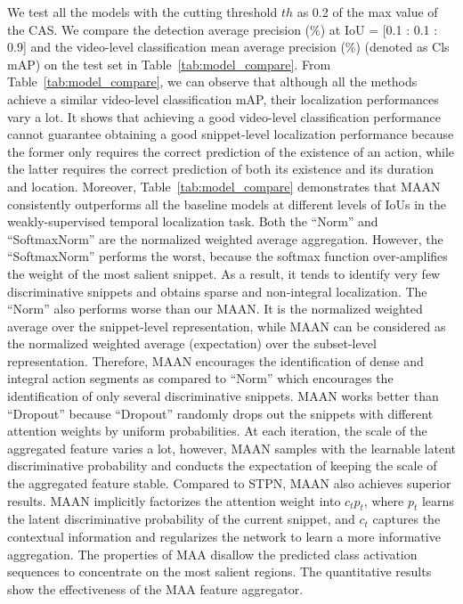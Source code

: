 \documentclass{article} \usepackage{iclr2019_conference,times}
\begin{document}
\vspace{-1mm}
We test all the models with the cutting threshold $ th $ as 0.2 of the max value of the CAS. We compare the detection average precision (\%) at IoU = [0.1 : 0.1 : 0.9] and the video-level classification mean average precision (\%) (denoted as Cls mAP) on the test set in Table~\ref{tab:model_compare}. From Table~\ref{tab:model_compare}, we can observe that although all the methods achieve a similar video-level classification mAP, their localization performances vary a lot. It shows that achieving a good video-level classification performance cannot guarantee obtaining a good snippet-level localization performance because the former only requires the correct prediction of the existence of an action, while the latter requires the correct prediction of both its existence and its duration and location. Moreover, Table~\ref{tab:model_compare} demonstrates that MAAN consistently outperforms all the baseline models at different levels of IoUs in the weakly-supervised temporal localization task. Both the ``Norm'' and ``SoftmaxNorm'' are the normalized weighted average aggregation. However, the ``SoftmaxNorm'' performs the worst, because the softmax function over-amplifies the weight of the most salient snippet. As a result, it tends to identify very few discriminative snippets and obtains sparse and non-integral localization.  The ``Norm'' also performs worse than our MAAN. It is the normalized weighted average over the snippet-level representation,  while MAAN can be considered as the normalized weighted average (expectation) over the subset-level representation. Therefore, MAAN encourages the identification of dense and integral action segments as compared to ``Norm'' which encourages the identification of only several discriminative snippets. MAAN works better than “Dropout” because “Dropout” randomly drops out the snippets with different attention weights by uniform probabilities. At each iteration, the scale of the aggregated feature varies a lot, however, MAAN samples with the learnable latent discriminative probability and conducts the expectation of keeping the scale of the aggregated feature stable. Compared to STPN, MAAN also achieves superior results. MAAN implicitly factorizes the attention weight into $c_tp_t$, where $p_t$ learns the latent discriminative probability of the current snippet, and $c_t$ captures the contextual information and regularizes the network to learn a more informative aggregation. The properties of MAA disallow the predicted class activation sequences to concentrate on the most salient regions. The quantitative results show the effectiveness of the MAA feature aggregator.
\end{document}

